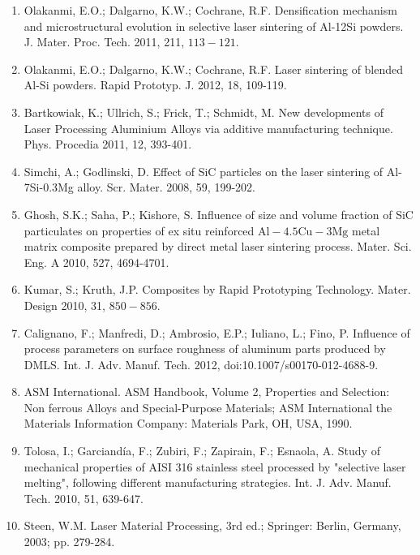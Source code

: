 \documentclass[10pt]{article}
\begin{document}
\begin{enumerate}
  \item Olakanmi, E.O.; Dalgarno, K.W.; Cochrane, R.F. Densification mechanism and microstructural evolution in selective laser sintering of Al-12Si powders. J. Mater. Proc. Tech. 2011, 211, $113-121$.

  \item Olakanmi, E.O.; Dalgarno, K.W.; Cochrane, R.F. Laser sintering of blended Al-Si powders. Rapid Prototyp. J. 2012, 18, 109-119.

  \item Bartkowiak, K.; Ullrich, S.; Frick, T.; Schmidt, M. New developments of Laser Processing Aluminium Alloys via additive manufacturing technique. Phys. Procedia 2011, 12, 393-401.

  \item Simchi, A.; Godlinski, D. Effect of SiC particles on the laser sintering of Al-7Si-0.3Mg alloy. Scr. Mater. 2008, 59, 199-202.

  \item Ghosh, S.K.; Saha, P.; Kishore, S. Influence of size and volume fraction of SiC particulates on properties of ex situ reinforced $\mathrm{Al}-4.5 \mathrm{Cu}-3 \mathrm{Mg}$ metal matrix composite prepared by direct metal laser sintering process. Mater. Sci. Eng. A 2010, 527, 4694-4701.

  \item Kumar, S.; Kruth, J.P. Composites by Rapid Prototyping Technology. Mater. Design 2010, 31, $850-856$.

  \item Calignano, F.; Manfredi, D.; Ambrosio, E.P.; Iuliano, L.; Fino, P. Influence of process parameters on surface roughness of aluminum parts produced by DMLS. Int. J. Adv. Manuf. Tech. 2012, doi:10.1007/s00170-012-4688-9.

  \item ASM International. ASM Handbook, Volume 2, Properties and Selection: Non ferrous Alloys and Special-Purpose Materials; ASM International the Materials Information Company: Materials Park, OH, USA, 1990.

  \item Tolosa, I.; Garciandía, F.; Zubiri, F.; Zapirain, F.; Esnaola, A. Study of mechanical properties of AISI 316 stainless steel processed by "selective laser melting", following different manufacturing strategies. Int. J. Adv. Manuf. Tech. 2010, 51, 639-647.

  \item Steen, W.M. Laser Material Processing, 3rd ed.; Springer: Berlin, Germany, 2003; pp. 279-284.

\end{enumerate}
\end{document}
